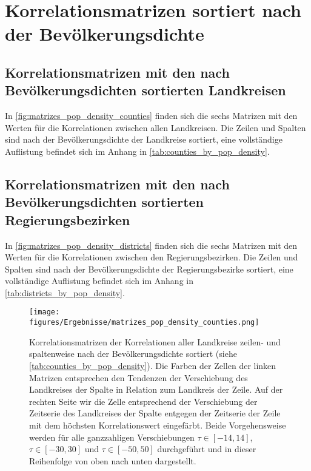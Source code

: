 \section{Korrelationsmatrizen sortiert nach der Bevölkerungsdichte}
\subsection{Korrelationsmatrizen mit den nach Bevölkerungsdichten sortierten Landkreisen}
In \autoref{fig:matrizes_pop_density_counties} finden sich die sechs Matrizen mit den Werten für die Korrelationen zwischen allen Landkreisen. Die Zeilen und Spalten sind nach der Bevölkerungsdichte der Landkreise sortiert, eine vollständige Auflistung befindet sich im Anhang in \autoref{tab:counties_by_pop_density}.

\subsection{Korrelationsmatrizen mit den nach Bevölkerungsdichten sortierten Regierungsbezirken}
In \autoref{fig:matrizes_pop_density_districts} finden sich die sechs Matrizen mit den Werten für die Korrelationen zwischen den Regierungsbezirken. Die Zeilen und Spalten sind nach der Bevölkerungsdichte der Regierungsbezirke sortiert, eine vollständige Auflistung befindet sich im Anhang in \autoref{tab:districts_by_pop_density}.

\begin{figure}[H]
    \centering
    \texttt{[image: figures/Ergebnisse/matrizes\_pop\_density\_counties.png]}
    \caption{Korrelationsmatrizen der Korrelationen aller Landkreise zeilen- und spaltenweise nach der Bevölkerungsdichte sortiert (siehe \autoref{tab:counties_by_pop_density}). Die Farben der Zellen der linken Matrizen entsprechen den Tendenzen der Verschiebung des Landkreises der Spalte in Relation zum Landkreis der Zeile.
    Auf der rechten Seite wir die Zelle entsprechend der Verschiebung der Zeitserie des Landkreises der Spalte entgegen der Zeitserie der Zeile mit dem höchsten Korrelationswert eingefärbt. Beide Vorgehensweise werden für alle ganzzahligen Verschiebungen $\tau\in[-14,14]$,  $\tau\in[-30,30]$ und  $\tau\in[-50,50]$ durchgeführt und in dieser Reihenfolge von oben nach unten dargestellt.}
    \label{fig:matrizes_pop_density_counties}
\end{figure}


